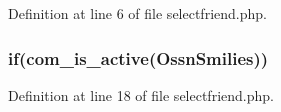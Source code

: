 Definition at line 6 of file selectfriend.\+php.

\subsubsection[{\texorpdfstring{if}{if}}]{\setlength{\rightskip}{0pt plus 5cm}if({\bf com\+\_\+is\+\_\+active}(\textquotesingle{}Ossn\+Smilies\textquotesingle{}))}\hypertarget{selectfriend_8php_a74be1d688625bd48e8b55a552c93cb08}{}\label{selectfriend_8php_a74be1d688625bd48e8b55a552c93cb08}


Definition at line 18 of file selectfriend.\+php.

